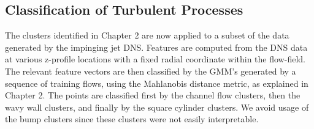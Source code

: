 %
%

\subsection{Classiﬁcation of Turbulent Processes}
The clusters identiﬁed in Chapter 2 are now applied to a subset of the data generated by the impinging jet DNS. Features are computed from the DNS data at various z-proﬁle locations with a ﬁxed radial coordinate 
%
%
within the ﬂow-ﬁeld. The relevant feature vectors are then classiﬁed by the GMM’s generated by a
sequence of training ﬂows, using the Mahlanobis distance metric, as explained in Chapter 2. The points are classiﬁed ﬁrst by the channel ﬂow clusters, then the wavy wall clusters, and ﬁnally by the square cylinder clusters. We avoid usage of the bump clusters since these clusters were not easily interpretable.

